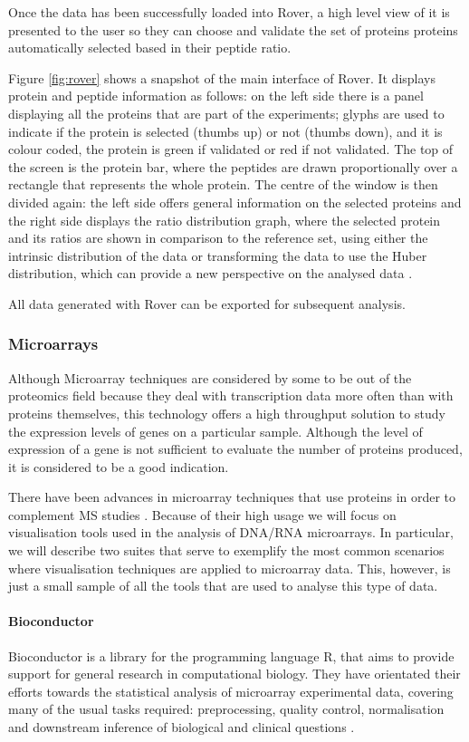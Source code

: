 Once the data has been successfully loaded into Rover, a high level view of it is presented to the user so they can choose and validate the set of proteins proteins automatically selected based in their peptide ratio. 

Figure \ref{fig:rover} shows a snapshot of the main interface of Rover. It displays protein and peptide information as follows: on the left side there is a panel displaying all the proteins that are part of the experiments; glyphs are used to indicate if the protein is selected (thumbs up) or not (thumbs down), and it is colour coded, the protein is green if validated or red if not validated. The top of the screen is the protein bar, where the peptides are drawn proportionally over a rectangle that represents the whole protein. The centre of the window is then divided again: the left side offers general information on the selected proteins and the right side displays the ratio distribution graph, where the selected protein and its ratios are shown in comparison to the reference set, using either the intrinsic distribution of the data or transforming the data to use the Huber distribution, which can provide a new perspective on the analysed data \cite{COL2010}.

All data generated with Rover can be exported for subsequent analysis.

\subsubsection{Microarrays}
Although Microarray techniques are considered by some to be out of the proteomics field because they deal with transcription data more often than with proteins themselves, this technology offers a high throughput solution to study the expression levels of genes on a particular sample. Although the level of expression of a gene is not sufficient to evaluate the number of proteins produced, it is considered to be a good indication.

There have been advances in microarray techniques that use proteins in order to complement MS studies \cite{PRA2014}. Because of their high usage we will focus on visualisation tools used in the analysis of DNA/RNA microarrays. In particular, we will describe two suites that serve to exemplify the most common scenarios where visualisation techniques are applied to microarray data. This, however, is just a small sample of all the tools that are used to analyse this type of data.

\paragraph{Bioconductor}
Bioconductor is a library for the programming language R, that aims to provide support for general research in computational biology. They have orientated their efforts towards the statistical analysis of microarray experimental data, covering many of the usual tasks required: preprocessing, quality control, normalisation and downstream inference of biological and clinical questions \cite{GEN2004}.

